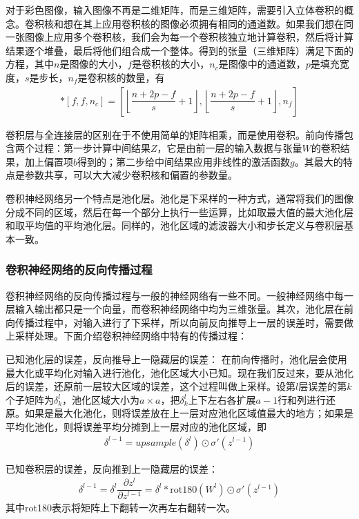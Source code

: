 \documentclass[supercite]{HustGraduPaper}
\begin{document}
\begin{sloppypar}
   对于彩色图像，输入图像不再是二维矩阵，而是三维矩阵，需要引入立体卷积的概念。卷积核和想在其上应用卷积核的图像必须拥有相同的通道数。如果我们想在同一张图像上应用多个卷积核，我们会为每一个卷积核独立地计算卷积，然后将计算结果逐个堆叠，最后将他们组合成一个整体。得到的张量（三维矩阵）满足下面的方程，其中$n$是图像的大小，$f$是卷积核的大小，$n_c$是图像中的通道数，$p$是填充宽度，$s$是步长，$n_f$是卷积核的数量，有\begin{gather}
    [n,n,n_c]*[f,f,n_c]=\left[ \left\lfloor \dfrac{n+2p-f}{s}+1\right\rfloor,\left\lfloor \dfrac{n+2p-f}{s}+1\right\rfloor,n_f \right]
   \end{gather}

   卷积层与全连接层的区别在于不使用简单的矩阵相乘，而是使用卷积。前向传播包含两个过程：第一步计算中间结果$Z$，它是由前一层的输入数据与张量$W$的卷积结果，加上偏置项$b$得到的；第二步给中间结果应用非线性的激活函数$g$。其最大的特点是参数共享，可以大大减少卷积核和偏置的参数量。

   卷积神经网络另一个特点是池化层。池化是下采样的一种方式，通常将我们的图像分成不同的区域，然后在每一个部分上执行一些运算，比如取最大值的最大池化层和取平均值的平均池化层。同样的，池化区域的滤波器大小和步长定义与卷积层基本一致。
  \subsubsection{卷积神经网络的反向传播过程}
  卷积神经网络的反向传播过程与一般的神经网络有一些不同。一般神经网络中每一层输入输出都只是一个向量，而卷积神经网络中均为三维张量。其次，池化层在前向传播过程中，对输入进行了下采样，所以向前反向推导上一层的误差时，需要做上采样处理。下面介绍卷积神经网络中特有的传播过程：
  
  {\heiti 已知池化层的误差，反向推导上一隐藏层的误差：} 在前向传播时，池化层会使用最大化或平均化对输入进行池化，池化区域大小已知。现在我们反过来，要从池化后的误差，还原前一层较大区域的误差，这个过程叫做上采样。设第$l$层误差的第$k$个子矩阵为$\delta^l_k$，池化区域大小为$a\times a$，把$\delta^l_k$上下左右各扩展$a-1$行和列进行还原。如果是最大化池化，则将误差放在上一层对应池化区域值最大的地方；如果是平均化池化，则将误差平均分摊到上一层对应的池化区域，即\begin{gather}
   \delta^{l-1}=upsample(\delta^l)\odot\sigma'(z^{l-1})
  \end{gather}

  {\heiti 已知卷积层的误差，反向推到上一隐藏层的误差：}\begin{gather}
   \delta^{l-1}=\delta^l\dfrac{\partial z^l}{\partial z^{l-1}}=\delta^l*\text{rot180}(W^l)\odot \sigma'(z^{l-1})
  \end{gather}
  其中rot180表示将矩阵上下翻转一次再左右翻转一次。


\end{sloppypar}
\end{document}
